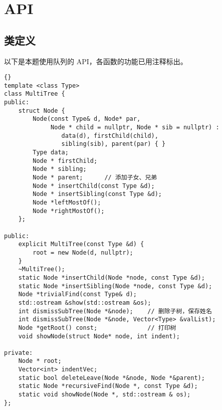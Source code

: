 \section{API}

\subsection{类定义}
以下是本题使用队列的 API，各函数的功能已用注释标出。
\begin{lstlisting}[morendkeywords={MultiTree}, firstnumber=254, caption=MultiTree 类定义]{}
template <class Type>
class MultiTree {
public:
    struct Node {  
        Node(const Type& d, Node* par,
             Node * child = nullptr, Node * sib = nullptr) :
                data(d), firstChild(child), 
                sibling(sib), parent(par) { }
        Type data;
        Node * firstChild;
        Node * sibling;
        Node * parent;      // 添加子女、兄弟
        Node * insertChild(const Type &d);
        Node * insertSibling(const Type &d);
        Node *leftMostOf();
        Node *rightMostOf();
    };

public:
    explicit MultiTree(const Type &d) {
        root = new Node(d, nullptr);
    }
    ~MultiTree();
    static Node *insertChild(Node *node, const Type &d);
    static Node *insertSibling(Node *node, const Type &d);
    Node *trivialFind(const Type& d);
    std::ostream &show(std::ostream &os);
    int dismissSubTree(Node *&node);    // 删除子树，保存姓名
    int dismissSubTree(Node *&node, Vector<Type> &valList);
    Node *getRoot() const;              // 打印树
    void showNode(struct Node* node, int indent);

private:
    Node * root;
    Vector<int> indentVec;
    static bool deleteLeave(Node *&node, Node *&parent);
    static Node *recursiveFind(Node *, const Type &d);
    static void showNode(Node *, std::ostream & os);
};
\end{lstlisting}

